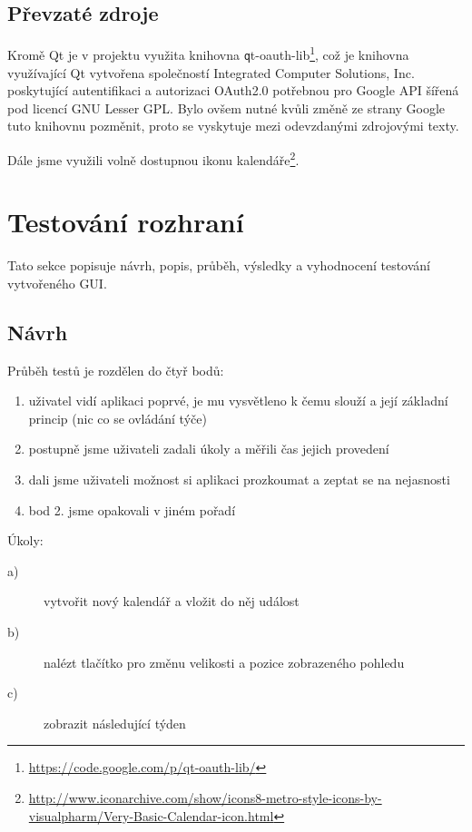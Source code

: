 \documentclass[a4paper, 12pt]{article}[7.12.2013]
\begin{document}
\subsection{Převzaté zdroje}
Kromě Qt je v projektu využita knihovna {\texttt qt-oauth-lib}\footnote{\url{https://code.google.com/p/qt-oauth-lib/}}, což je knihovna využívající Qt vytvořena společností Integrated Computer Solutions, Inc. poskytující autentifikaci a autorizaci OAuth2.0 potřebnou pro Google API šířená pod licencí GNU Lesser GPL. Bylo ovšem nutné kvůli změně ze strany Google tuto knihovnu pozměnit, proto se vyskytuje mezi odevzdanými zdrojovými texty.

Dále jsme využili volně dostupnou ikonu kalendáře\footnote{\url{http://www.iconarchive.com/show/icons8-metro-style-icons-by-visualpharm/Very-Basic-Calendar-icon.html}}.

\section{Testování rozhraní} \label{testovani}
Tato sekce popisuje návrh, popis, průběh, výsledky a vyhodnocení testování vytvořeného GUI.
\subsection{Návrh}
Průběh testů je rozdělen do čtyř bodů:
\begin{enumerate}
\item uživatel vidí aplikaci poprvé, je mu vysvětleno k čemu slouží a její základní princip (nic co se ovládání týče)
\item postupně jsme uživateli zadali úkoly a měřili čas jejich provedení
\item dali jsme uživateli možnost si aplikaci prozkoumat a zeptat se na nejasnosti
\item bod 2. jsme opakovali v jiném pořadí
\end{enumerate}
Úkoly:
\begin{description}
    \item[a)] vytvořit nový kalendář a vložit do něj událost
    \item[b)] nalézt tlačítko pro změnu velikosti a pozice zobrazeného pohledu
    \item[c)] zobrazit následující týden
\end{description}
\end{document}
